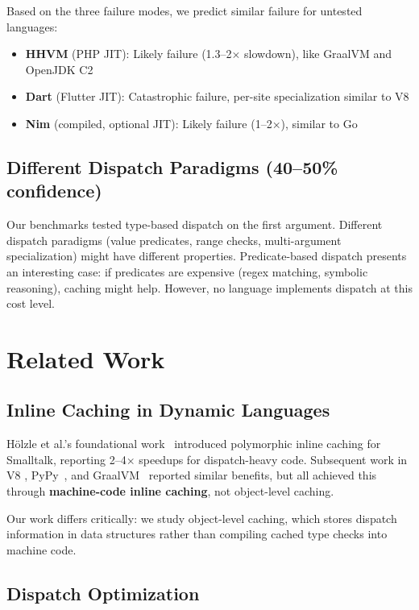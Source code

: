 \documentclass[sigplan,final]{acmart}
\begin{document}
Based on the three failure modes, we predict similar failure for untested languages:

\begin{itemize}
  \item \textbf{HHVM} (PHP JIT): Likely failure (1.3--2× slowdown), like GraalVM and OpenJDK C2

  \item \textbf{Dart} (Flutter JIT): Catastrophic failure, per-site specialization similar to V8

  \item \textbf{Nim} (compiled, optional JIT): Likely failure (1--2×), similar to Go
\end{itemize}

\subsection{Different Dispatch Paradigms (40--50\% confidence)}

Our benchmarks tested type-based dispatch on the first argument. Different dispatch paradigms
(value predicates, range checks, multi-argument specialization) might have different properties.
Predicate-based dispatch presents an interesting case: if predicates are expensive (regex matching,
symbolic reasoning), caching might help. However, no language implements dispatch at this cost
level.

\section{Related Work}

\subsection{Inline Caching in Dynamic Languages}

Hölzle et al.'s foundational work~\cite{hoelzle1991optimizing} introduced polymorphic inline
caching for Smalltalk, reporting 2--4× speedups for dispatch-heavy code. Subsequent work in V8
\cite{bak2010v8}, PyPy~\cite{pypy2}, and GraalVM~\cite{graalvm} reported similar benefits, but
all achieved this through \textbf{machine-code inline caching}, not object-level caching.

Our work differs critically: we study object-level caching, which stores dispatch information in
data structures rather than compiling cached type checks into machine code.

\subsection{Dispatch Optimization}
\end{document}
